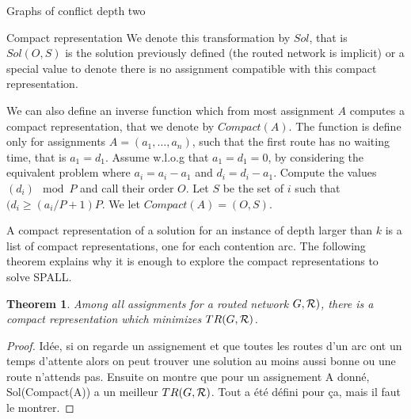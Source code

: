 \documentclass[10pt]{article}
\newtheorem{theorem}{Theorem}
\newcommand\spall{\textsc{SPALL}\xspace}
\begin{document}
\begin{section}{Graphs of conflict depth two}
\begin{subsection}{Compact representation}
We denote this transformation by $Sol$, that is $Sol(O,S)$ is the solution previously defined
(the routed network is implicit) or a special value to denote there is no assignment compatible with this compact representation. 

We can also define an inverse function which from most assignment $A$ computes a compact representation, that we denote by $Compact(A)$. The function is define only for
assignments $A = (a_1,\dots,a_n)$, such that the first route has no waiting time, that is $a_1 = d_1$. Assume w.l.o.g that $a_1 = d_1 = 0$, by considering the equivalent problem where $a_i= a_i -a_1$ and $d_i = d_i - a_1$.
Compute the values $(d_i)\mod P$ and  call their order $O$. Let 
 $S$ be the set of $i$ such that $(d_i \geq (a_i / P + 1) P$. We let $Compact(A) = (O,S)$.


A compact representation of a solution for an instance of depth larger than $k$
is a list of compact representations, one for each contention arc. The following theorem explains why it is enough to explore the compact representations to solve \spall.

\begin{theorem}
Among all assignments for a routed network $G,{\cal R})$, there is a compact representation which minimizes $TR(G,{\cal R})$.
\end{theorem}
\begin{proof}
Idée, si on regarde un assignement et que toutes les routes d'un arc ont 
un temps d'attente alors on peut trouver une solution au moins aussi bonne ou 
une route n'attends pas. Ensuite on montre que pour un assignement A donné, 
Sol(Compact(A)) a un meilleur $TR(G,{\cal R})$. Tout a été défini pour ça, mais il faut le montrer.

\end{proof}
\end{subsection}
  

\end{section}
	 



\end{document}

